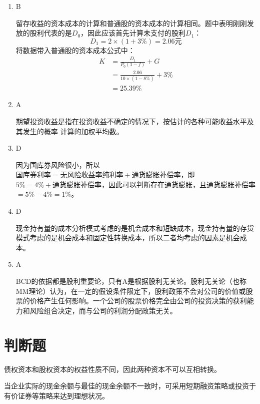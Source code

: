 \documentclass[
  10pt,
  twoside,
  openany,
  b5paper, %
  colorscheme = black, %
  xits = false,
]{qyxf-book}
\begin{document}
\begin{note}
	\begin{enumerate}
		\item B
		
		留存收益的资本成本的计算和普通股的资本成本的计算相同。题中表明刚刚发放的股利代表的是$D_0$，因此应该首先计算未支付的股利$D_1$：
		\begin{equation*}
			D_1 = 2 \times (1+3\%) = 2.06 \text{元}
		\end{equation*}
		将数据带入普通股的资本成本公式中：
		\begin{equation*}
			\begin{aligned}
				K &= \frac{D_1}{P_0(1-f)} +G \\[1.5ex] 
				&= \frac{2.06}{10 \times (1-8\%)} + 3\% \\[1.5ex]
				&=25.39\%
			\end{aligned}
		\end{equation*}
		\item A
		
		期望投资收益是指在投资收益不确定的情况下，按估计的各种可能收益水平及其发生的概率
		计算的加权平均数。
		\item D
		
		因为国库券风险很小，所以$\text{国库券利率}=\text{无风险收益率纯利率}+\text{通货膨胀补偿率}$，即$5\%=4\%+\text{通货膨胀补偿率}$，因此可以判断存在通货膨胀，且通货膨胀补偿率$=5\%-4\%=1\%$。
		\item D
		
		现金持有量的成本分析模式考虑的是机会成本和短缺成本，现金持有量的存货模式考虑的是机会成本和固定性转换成本，所以二者均考虑的因素是机会成本。
		\item A
		
		 BCD的依据都是股利重要论，只有A是根据股利无关论。股利无关论（也称MM理论）认为，在一定的假设条件限定下，股利政策不会对公司的价值或股票的价格产生任何影响。一个公司的股票价格完全由公司的投资决策的获利能力和风险组合决定，而与公司的利润分配政策无关。
	\end{enumerate}
\end{note}

\newpage

\section{判断题}

 债权资本和股权资本的权益性质不同，因此两种资本不可以互相转换。

 当企业实际的现金余额与最佳的现金余额不一致时，可采用短期融资策略或投资于有价证券等策略来达到理想状况。
\end{document}
